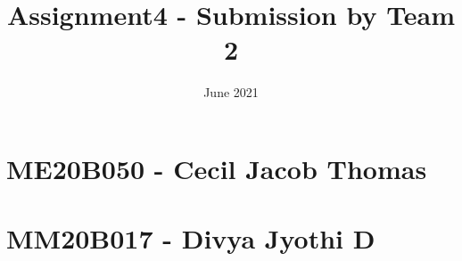 \documentclass[12pt]{article}
\title{\textbf{Assignment4 - Submission by Team 2}}
\date{June 2021}
\begin{document}
\begin{titlepage}
\maketitle
\end{titlepage}

\newpage

\tableofcontents

\newpage

\section{ME20B050 - Cecil Jacob Thomas}



\section{MM20B017 - Divya Jyothi D}

\newpage



\end{document}
